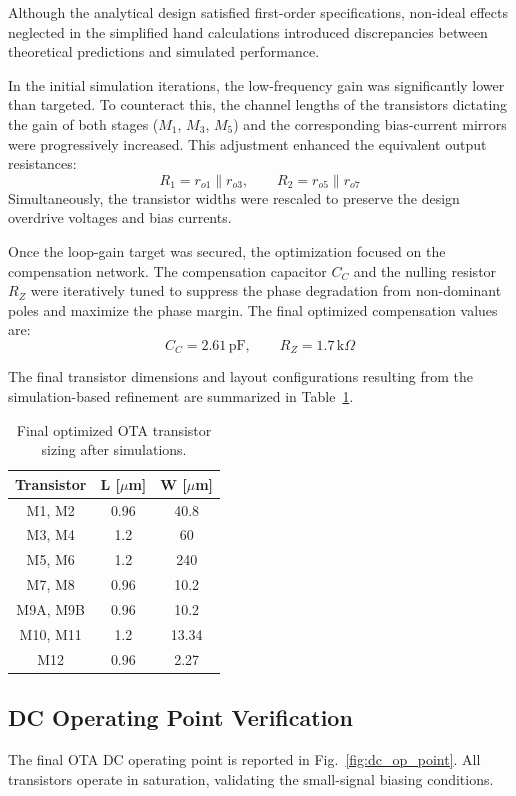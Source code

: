 Although the analytical design satisfied first-order specifications, non-ideal effects neglected in the simplified hand calculations introduced discrepancies between theoretical predictions and simulated performance.

In the initial simulation iterations, the low-frequency gain was significantly lower than targeted. To counteract this, the channel lengths of the transistors dictating the gain of both stages (\(M_1\), \(M_3\), \(M_5\)) and the corresponding bias-current mirrors were progressively increased. This adjustment enhanced the equivalent output resistances:
\[
R_1=r_{o1}\parallel r_{o3}, \qquad R_2=r_{o5}\parallel r_{o7}
\]
Simultaneously, the transistor widths were rescaled to preserve the design overdrive voltages and bias currents.

Once the loop-gain target was secured, the optimization focused on the compensation network. The compensation capacitor \(C_C\) and the nulling resistor \(R_Z\) were iteratively tuned to suppress the phase degradation from non-dominant poles and maximize the phase margin. The final optimized compensation values are:
\[
\boxed{C_C=2.61\,\mathrm{pF}}, \qquad \boxed{R_Z=1.7\,\mathrm{k}\Omega}
\]

The final transistor dimensions and layout configurations resulting from the simulation-based refinement are summarized in Table~\ref{tab:final_ota_sizing4}.

\begin{table}[H]
\centering
\begin{tabular}{|c|c|c|}
\hline
\textbf{Transistor} & \textbf{L [$\mu$m]} & \textbf{W [$\mu$m]} \\ \hline
M1, M2    & 0.96 & 40.8  \\ \hline
M3, M4    & 1.2  & 60    \\ \hline
M5, M6    & 1.2  & 240   \\ \hline
M7, M8    & 0.96 & 10.2  \\ \hline
M9A, M9B & 0.96 & 10.2  \\ \hline
M10, M11 & 1.2  & 13.34 \\ \hline
M12       & 0.96 & 2.27  \\ \hline
\end{tabular}
\caption{Final optimized OTA transistor sizing after simulations.}
\label{tab:final_ota_sizing4}
\end{table}

\subsection{DC Operating Point Verification}
The final OTA DC operating point is reported in Fig.~\ref{fig:dc_op_point}. All transistors operate in saturation, validating the small-signal biasing conditions.

